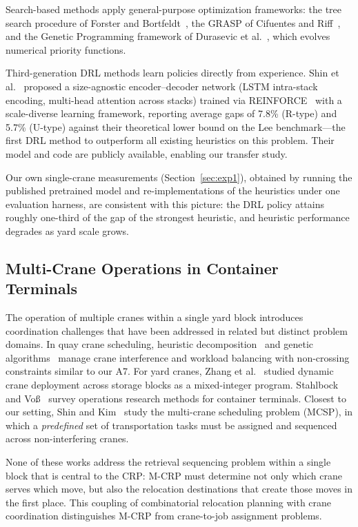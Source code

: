 \documentclass[11pt,a4paper]{elsarticle}
\begin{document}
Search-based methods apply general-purpose optimization frameworks: the tree search procedure of Forster and Bortfeldt~\cite{forster2012}, the GRASP of Cifuentes and Riff~\cite{cifuentes2020}, and the Genetic Programming framework of Durasevic et al.~\cite{durasevic2025}, which evolves numerical priority functions.

Third-generation DRL methods learn policies directly from experience. Shin et al.~\cite{shin2026} proposed a size-agnostic encoder--decoder network (LSTM intra-stack encoding, multi-head attention across stacks) trained via REINFORCE~\cite{williams1992} with a scale-diverse learning framework, reporting average gaps of 7.8\% (R-type) and 5.7\% (U-type) against their theoretical lower bound on the Lee benchmark---the first DRL method to outperform all existing heuristics on this problem. Their model and code are publicly available, enabling our transfer study.

Our own single-crane measurements (Section~\ref{sec:exp1}), obtained by running the published pretrained model and re-implementations of the heuristics under one evaluation harness, are consistent with this picture: the DRL policy attains roughly one-third of the gap of the strongest heuristic, and heuristic performance degrades as yard scale grows.

\subsection{Multi-Crane Operations in Container Terminals}

The operation of multiple cranes within a single yard block introduces coordination challenges that have been addressed in related but distinct problem domains. In quay crane scheduling, heuristic decomposition~\cite{legato2001} and genetic algorithms~\cite{sammarra2007} manage crane interference and workload balancing with non-crossing constraints similar to our A7. For yard cranes, Zhang et al.~\cite{zhang2002} studied dynamic crane deployment across storage blocks as a mixed-integer program. Stahlbock and Vo{\ss}~\cite{stahlbock2008} survey operations research methods for container terminals. Closest to our setting, Shin and Kim~\cite{shinkim2025} study the multi-crane scheduling problem (MCSP), in which a \emph{predefined} set of transportation tasks must be assigned and sequenced across non-interfering cranes.

None of these works address the retrieval sequencing problem within a single block that is central to the CRP: M-CRP must determine not only which crane serves which move, but also the relocation destinations that create those moves in the first place. This coupling of combinatorial relocation planning with crane coordination distinguishes M-CRP from crane-to-job assignment problems.
\end{document}
